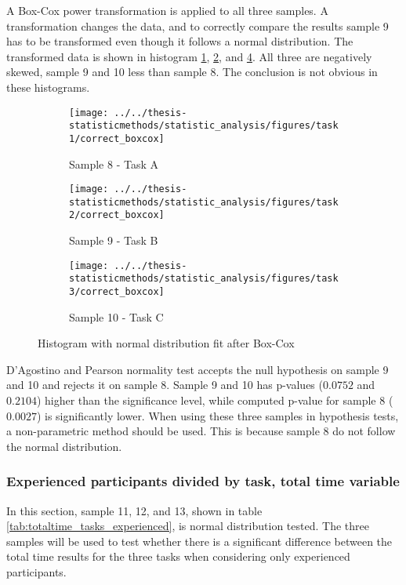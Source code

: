 A Box-Cox power transformation is applied to all three samples. A transformation changes the data, and to correctly compare the results sample 9 has to be transformed even though it follows a normal distribution. The transformed data is shown in histogram \ref{fig:correctboxcox_task1}, \ref{fig:correctboxcox_task2}, and \ref{fig:correctboxcox_task3}. All three are negatively skewed, sample 9 and 10 less than sample 8. The conclusion is not obvious in these histograms.

\begin{figure}[H]
	\centering
	\begin{subfigure}[b]{0.3\textwidth}
		\centering
		\texttt{[image: ../../thesis-statisticmethods/statistic\_analysis/figures/task1/correct\_boxcox]}
		\caption{Sample 8 - Task A}
		\label{fig:correctboxcox_task1}
	\end{subfigure}
	\begin{subfigure}[b]{0.3\textwidth}
		\centering
		\texttt{[image: ../../thesis-statisticmethods/statistic\_analysis/figures/task2/correct\_boxcox]}
		\caption{Sample 9 - Task B}
		\label{fig:correctboxcox_task2}
	\end{subfigure}
	\begin{subfigure}[b]{0.3\textwidth}
		\centering
		\texttt{[image: ../../thesis-statisticmethods/statistic\_analysis/figures/task3/correct\_boxcox]}
		\caption{Sample 10 - Task C}
		\label{fig:correctboxcox_task3}
	\end{subfigure}
	\caption{Histogram with normal distribution fit after Box-Cox}
\end{figure}

D'Agostino and Pearson normality test accepts the null hypothesis on sample 9 and 10 and rejects it on sample 8. Sample 9 and 10 has p-values ($0.0752$ and $0.2104$) higher than the significance level, while computed p-value for sample 8 ($0.0027$) is significantly lower. When using these three samples in hypothesis tests, a non-parametric method should be used. This is because sample 8 do not follow the normal distribution.

\subsubsection[Sample 11, 12 and 13]{Experienced participants divided by task, total time variable}
In this section, sample 11, 12, and 13, shown in table \ref{tab:totaltime_tasks_experienced}, is normal distribution tested. The three samples will be used to test whether there is a significant difference between the total time results for the three tasks when considering only experienced participants. 

